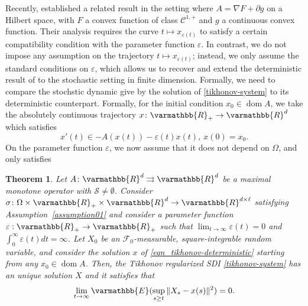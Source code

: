 \documentclass[11pt,reqno]{article}
\let\mathbb=\varmathbb
\newcommand{\R}{\mathbb{R}}
\newcommand{\dom}{\operatorname{dom}}
\renewcommand{\epsilon}{\varepsilon}
\newcommand{\1}{\mathds{1}}
\numberwithin{equation}{section}  %
\theoremstyle{plain}
\newtheorem{theorem}{Theorem}
\theoremstyle{definition}
\theoremstyle{remark}
\numberwithin{theorem}{section}
\numberwithin{remark}{section}
\numberwithin{example}{section}
\begin{document}
Recently, \cite[Theorem 14]{MR4991707} established a related result in the setting
where $A = \nabla F + \partial g$ on a Hilbert space, with $F$ a convex function of class
$\mathcal{C}^{1,+}$ and $g$ a continuous convex function. Their analysis requires the curve
$t \mapsto x_{\epsilon(t)}$ to satisfy a certain compatibility condition with the parameter function
$\epsilon$. In contrast, we do not impose any assumption on the trajectory $t \mapsto x_{\epsilon(t)}$;
instead, we only assume the standard conditions on $\epsilon$, which allows us to recover and extend
the deterministic result of \cite[Proposition 5]{MR2462703} to the stochastic
setting in finite dimension. Formally, we need to compare the stochstic dynamic give by the solution of \eqref{tikhonov-system} to its deterministic counterpart. Formally, for the initial condition $x_0\in \dom A$, we take the absolutely continuous trajectory $x\colon \R_+\to \R^d$ which satisfies
\begin{equation}\label{eqn_tikhonov-deterministic}
    x'(t)\in -A(x(t)) - \epsilon(t)x(t), \ x(0) = x_0.
\end{equation}
On the parameter function $\epsilon$, we now assume that it does not depend on $\Omega$, and only satisfies 
\begin{theorem}\label{Main_resultTych}
  Let $A \colon \mathbb{R}^d \rightrightarrows \mathbb{R}^d$  be  a maximal monotone operator  with $\mathcal{S}\neq \emptyset$.  Consider $\sigma \colon \Omega \times  \R_+ \times \mathbb{R}^d \to \mathbb{R}^{d\times \ell}$  satisfying  Assumption~\ref{assumption01}  and consider a  parameter function $\epsilon : \mathbb{R}_+ \to \R_+ $
   such that $\lim_{t\to \infty}\epsilon(t) = 0$ and $\int_0^\infty\epsilon(t)dt = \infty$.   Let $X_0$ be an $\mathcal{F}_0$-measurable, square-integrable random variable, and consider  the solution $x$ of \eqref{eqn_tikhonov-deterministic} starting from any $x_0\in \dom A$.   Then, the  Tikhonov regularized SDI \eqref{tikhonov-system} has an unique solution $X$ and it satisfies that   $$\displaystyle\lim_{t\to \infty}\mathbb{E}(\sup_{s\geq t}\|X_s-x(s)\|^2) = 0.$$
\end{theorem}
\end{document}
